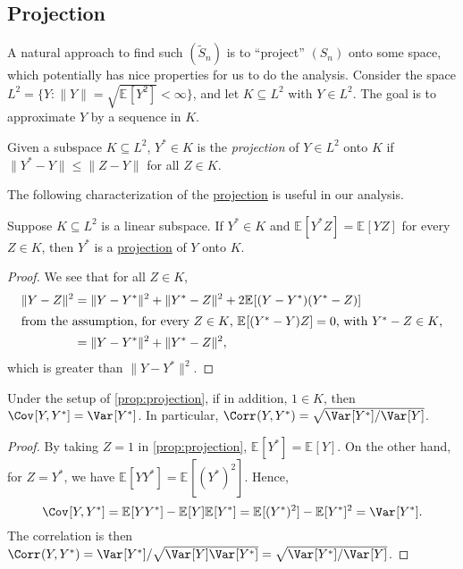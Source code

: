 \subsection{Projection}
A natural approach to find such \((\widetilde{S} _n)\) is to ``project'' \((S_n)\) onto some space, which potentially has nice properties for us to do the analysis. Consider the space \(L^2 = \{ Y \colon \lVert Y \rVert = \sqrt{\mathbb{E}_{}[Y^2] } < \infty \} \), and let \(K \subseteq L^2\) with \(Y \in L^2\). The goal is to approximate \(Y\) by a sequence in \(K\).

\begin{definition}[Projection]\label{def:projection}
	Given a subspace \(K \subseteq L^2\), \(Y^{\ast} \in K\) is the \emph{projection} of \(Y \in L^2\) onto \(K\) if \(\lVert Y^{\ast} - Y \rVert \leq \lVert Z - Y \rVert \) for all \(Z \in K\).
\end{definition}

The following characterization of the \hyperref[def:projection]{projection} is useful in our analysis.

\begin{proposition}\label{prop:projection}
	Suppose \(K \subseteq L^2\) is a linear subspace. If \(Y^{\ast} \in K\) and \(\mathbb{E}_{}[Y^{\ast} Z] = \mathbb{E}_{}[Y Z] \) for every \(Z \in K\), then \(Y^{\ast} \) is a \hyperref[def:projection]{projection} of \(Y\) onto \(K\).
\end{proposition}
\begin{proof}
	We see that for all \(Z \in K\),
	\begin{align*}
		\lVert Y - Z \rVert ^2
		 & = \lVert Y - Y^{\ast}  \rVert ^2 + \lVert Y^{\ast} - Z \rVert ^2 + 2 \mathbb{E}_{}[(Y-Y^{\ast} ) (Y^{\ast} - Z)] \\
		\shortintertext{from the assumption, for every \(Z \in K\), \(\mathbb{E}_{}[(Y^{\ast} - Y) Z] = 0 \), with \(Y^{\ast} - Z \in K\),}
		 & = \lVert Y - Y^{\ast}  \rVert ^2 + \lVert Y^{\ast} - Z \rVert ^2,
	\end{align*}
	which is greater than \(\lVert Y - Y^{\ast} \rVert ^2\).
\end{proof}

\begin{corollary}\label{col:projection}
	Under the setup of \autoref{prop:projection}, if in addition, \(1 \in K\), then \(\Cov_{}[Y, Y^{\ast} ] = \Var_{}[Y^{\ast} ] \). In particular, \(\Corr_{}(Y, Y^{\ast} ) = \sqrt{\Var_{}[Y^{\ast} ] / \Var_{}[Y] } \).
\end{corollary}
\begin{proof}
	By taking \(Z = 1\) in \autoref{prop:projection}, \(\mathbb{E}_{}[Y^{\ast} ] = \mathbb{E}_{}[Y] \). On the other hand, for \(Z = Y^{\ast} \), we have \(\mathbb{E}_{}[Y Y^{\ast} ] = \mathbb{E}_{}[(Y^{\ast} )^2] \). Hence,
	\[
		\Cov_{}[Y, Y^{\ast} ]
		= \mathbb{E}_{}[Y Y^{\ast} ] - \mathbb{E}_{}[Y] \mathbb{E}_{}[Y^{\ast} ]
		= \mathbb{E}_{}[(Y^{\ast} )^2] - \mathbb{E}_{}[Y^{\ast} ] ^2
		= \Var_{}[Y^{\ast} ].
	\]
	The correlation is then \(\Corr_{}(Y, Y^{\ast} ) = \Var_{}[Y^{\ast} ] / \sqrt{\Var_{}[Y] \Var_{}[Y^{\ast} ] } = \sqrt{\Var_{}[Y^{\ast} ] / \Var_{}[Y] }\).
\end{proof}

